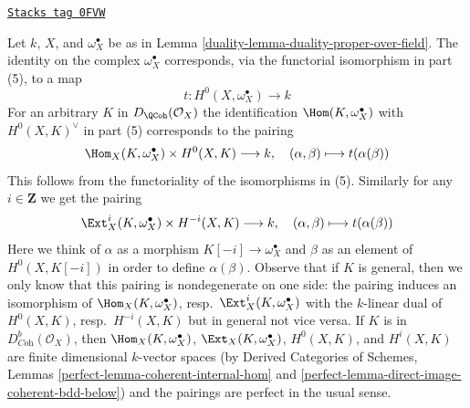 \begin{remark}
\label{duality-remark-duality-proper-over-field}
\href{https://stacks.math.columbia.edu/tag/0FVW}{\texttt{Stacks tag 0FVW}}

Let $k$, $X$, and $\omega_X^\bullet$
be as in Lemma \ref{duality-lemma-duality-proper-over-field}.
The identity on the complex $\omega_X^\bullet$ corresponds, via
the functorial isomorphism in part (5), to a map
$$
t : H^0(X, \omega_X^\bullet) \longrightarrow k
$$
For an arbitrary $K$ in $D_\QCoh(\mathcal{O}_X)$ the identification
$\Hom(K, \omega_X^\bullet)$ with $H^0(X, K)^\vee$ in part (5)
corresponds to the pairing
$$
\Hom_X(K, \omega_X^\bullet) \times H^0(X, K) \longrightarrow k,\quad
(\alpha, \beta) \longmapsto t(\alpha(\beta))
$$
This follows from the functoriality of the isomorphisms in (5). Similarly
for any $i \in \mathbf{Z}$ we get the pairing
$$
\Ext^i_X(K, \omega_X^\bullet) \times H^{-i}(X, K) \longrightarrow k,\quad
(\alpha, \beta) \longmapsto t(\alpha(\beta))
$$
Here we think of $\alpha$ as a morphism $K[-i] \to \omega_X^\bullet$
and $\beta$ as an element of $H^0(X, K[-i])$ in order to define
$\alpha(\beta)$. Observe that if $K$ is general, then we only know
that this pairing is nondegenerate on one side: the pairing induces an
isomorphism of $\Hom_X(K, \omega_X^\bullet)$,
resp.\ $\Ext^i_X(K, \omega_X^\bullet)$ with the $k$-linear dual of $H^0(X, K)$,
resp.\ $H^{-i}(X, K)$ but in general not vice versa. If $K$
is in $D^b_{\textit{Coh}}(\mathcal{O}_X)$, then
$\Hom_X(K, \omega_X^\bullet)$, $\Ext_X(K, \omega_X^\bullet)$,
$H^0(X, K)$, and $H^i(X, K)$ are finite dimensional $k$-vector spaces (by
Derived Categories of Schemes, Lemmas
\ref{perfect-lemma-coherent-internal-hom} and
\ref{perfect-lemma-direct-image-coherent-bdd-below})
and the pairings are perfect in the usual sense.
\end{remark}

